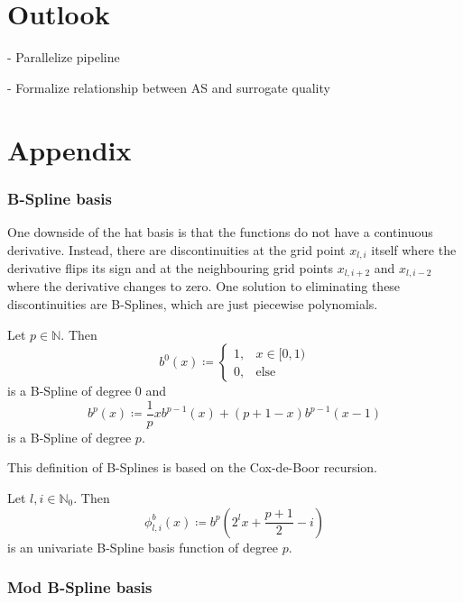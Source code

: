 \documentclass[
  a4paper,  %
  twoside,  %
  bibliography=totoc,
  headsepline,
  cleardoublepage=empty,
  parskip=half,
  draft=false
]{scrbook}
\begin{document}
\chapter{Outlook}
\label{chap:c9}

- Parallelize pipeline

- Formalize relationship between AS and surrogate quality

\appendix
\chapter{Appendix}

\subsection{B-Spline basis}

One downside of the hat basis is that the functions do not have a continuous derivative.
Instead, there are discontinuities at the grid point $x_{l,i}$ itself where the derivative flips its sign and at the neighbouring grid points $x_{l,i+2}$ and $x_{l,i-2}$ where the derivative changes to zero.
One solution to eliminating these discontinuities are B-Splines, which are just piecewise polynomials.
\begin{definition}[B-Splines]
Let $p \in \mathds{N}$.
Then
\begin{equation}
b^0(x) \coloneqq
\begin{cases}
    1, & x \in [0,1) \\
   0, & \text{else}
\end{cases}
\end{equation}
is a B-Spline of degree $0$ and
\begin{equation}
b^p(x) \coloneqq \frac{1}{p} xb^{p-1}(x) + (p + 1 - x) b^{p-1}(x-1) 
\end{equation}
is a B-Spline of degree $p$.
\end{definition}
This definition of B-Splines is based on the Cox-de-Boor recursion.

\begin{definition}
Let $l,i \in \mathds{N}_0$.
Then
\begin{equation}
\phi^b_{l,i}(x) \coloneqq b^p \left( 2^l x + \frac{p+1}{2} -i \right)
\end{equation}
is an univariate B-Spline basis function of degree $p$.
\end{definition}

\subsection{Mod B-Spline basis}
\end{document}
